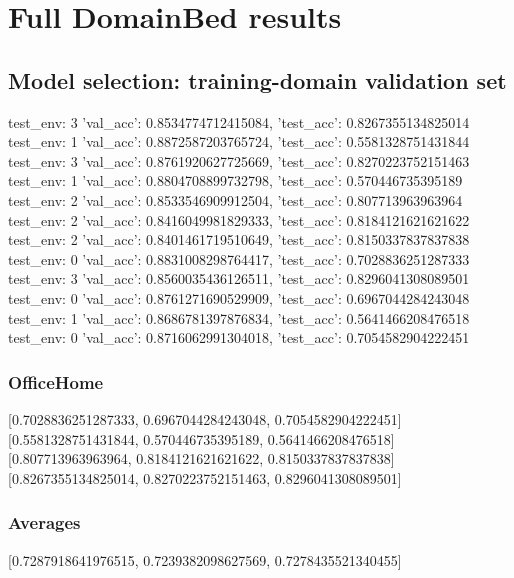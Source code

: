 \documentclass{article}
\begin{document}
\section{Full DomainBed results}

\subsection{Model selection: training-domain validation set}
test_env: 3
{'val_acc': 0.8534774712415084, 'test_acc': 0.8267355134825014}
test_env: 1
{'val_acc': 0.8872587203765724, 'test_acc': 0.5581328751431844}
test_env: 3
{'val_acc': 0.8761920627725669, 'test_acc': 0.8270223752151463}
test_env: 1
{'val_acc': 0.8804708899732798, 'test_acc': 0.570446735395189}
test_env: 2
{'val_acc': 0.8533546909912504, 'test_acc': 0.807713963963964}
test_env: 2
{'val_acc': 0.8416049981829333, 'test_acc': 0.8184121621621622}
test_env: 2
{'val_acc': 0.8401461719510649, 'test_acc': 0.8150337837837838}
test_env: 0
{'val_acc': 0.8831008298764417, 'test_acc': 0.7028836251287333}
test_env: 3
{'val_acc': 0.8560035436126511, 'test_acc': 0.8296041308089501}
test_env: 0
{'val_acc': 0.8761271690529909, 'test_acc': 0.6967044284243048}
test_env: 1
{'val_acc': 0.8686781397876834, 'test_acc': 0.5641466208476518}
test_env: 0
{'val_acc': 0.8716062991304018, 'test_acc': 0.7054582904222451}

\subsubsection{OfficeHome}
[0.7028836251287333, 0.6967044284243048, 0.7054582904222451]
[0.5581328751431844, 0.570446735395189, 0.5641466208476518]
[0.807713963963964, 0.8184121621621622, 0.8150337837837838]
[0.8267355134825014, 0.8270223752151463, 0.8296041308089501]

\begin{center}
\end{center}

\subsubsection{Averages}
[0.7287918641976515, 0.7239382098627569, 0.7278435521340455]

\begin{center}
\end{center}
\end{document}
